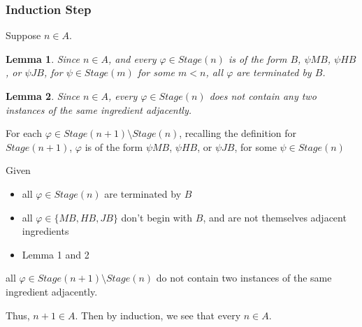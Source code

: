 \documentclass[a4paper]{article}
\newtheorem{lemma}{Lemma}
\newcommand{\SET}[1]{\{ {#1} \}}
\begin{document}
\begin{enumerate}
    \subsubsection*{Induction Step}
    Suppose $n \in A$.
    
    \begin{lemma}
    Since $n \in A$, and every $\varphi \in Stage(n)$ is of the form $B$, $\psi MB$, $\psi HB$, or $\psi JB$, for $\psi \in Stage(m)$ for some $m < n$, all $\varphi$ are terminated by $B$.
    \end{lemma}

    \begin{lemma}
    Since $n \in A$, every $\varphi \in Stage(n)$ does not contain any two instances of the same ingredient adjacently.
    \end{lemma}

        For each $\varphi \in Stage(n + 1) \setminus Stage(n)$, recalling the definition for $Stage(n + 1)$, $\varphi$ is of the form $\psi MB$, $\psi HB$, or $\psi JB$, for some $\psi \in Stage(n)$

        Given \begin{itemize}
            \item all $\varphi \in Stage(n)$ are terminated by $B$
            \item all $\varphi \in \SET{MB, HB, JB}$ don't begin with $B$, and are not themselves adjacent ingredients
            \item Lemma 1 and 2
        \end{itemize}
        
        all $\varphi \in Stage(n + 1) \setminus Stage(n)$ do not contain two instances of the same ingredient adjacently. 

        Thus, $n + 1 \in A$. Then by induction, we see that every $n \in A$.


\end{enumerate}
\end{document}
